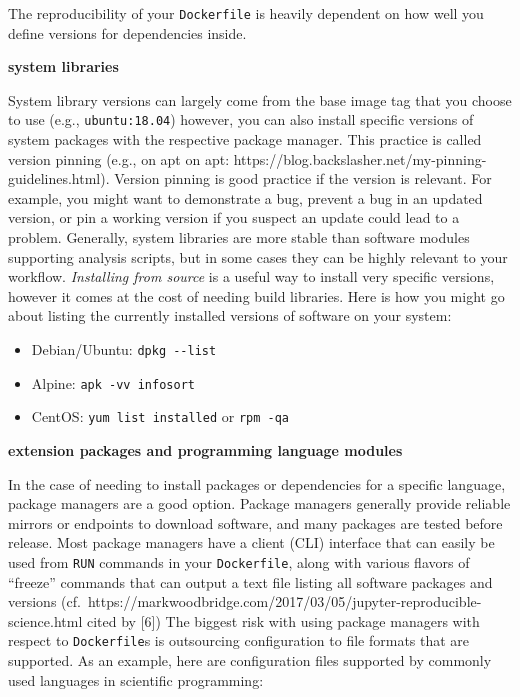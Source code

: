\documentclass[10pt,letterpaper]{article}
\providecommand{\tightlist}{%
  \setlength{\itemsep}{0pt}\setlength{\parskip}{0pt}}
\begin{document}
The reproducibility of your \texttt{Dockerfile} is heavily dependent on
how well you define versions for dependencies inside.

\textbf{system libraries}

System library versions can largely come from the base image tag that
you choose to use (e.g., \texttt{ubuntu:18.04}) however, you can also
install specific versions of system packages with the respective package
manager. This practice is called version pinning (e.g., on apt on apt:
https://blog.backslasher.net/my-pinning-guidelines.html). Version
pinning is good practice if the version is relevant. For example, you
might want to demonstrate a bug, prevent a bug in an updated version, or
pin a working version if you suspect an update could lead to a problem.
Generally, system libraries are more stable than software modules
supporting analysis scripts, but in some cases they can be highly
relevant to your workflow. \emph{Installing from source} is a useful way
to install very specific versions, however it comes at the cost of
needing build libraries. Here is how you might go about listing the
currently installed versions of software on your system:

\begin{itemize}
\tightlist
\item
  Debian/Ubuntu: \texttt{dpkg\ -\/-list}
\item
  Alpine: \texttt{apk\ -vv\ info\textbar{}sort}
\item
  CentOS: \texttt{yum\ list\ installed} or \texttt{rpm\ -qa}
\end{itemize}

\textbf{extension packages and programming language modules}

In the case of needing to install packages or dependencies for a
specific language, package managers are a good option. Package managers
generally provide reliable mirrors or endpoints to download software,
and many packages are tested before release. Most package managers have
a client (CLI) interface that can easily be used from \texttt{RUN}
commands in your \texttt{Dockerfile}, along with various flavors of
``freeze'' commands that can output a text file listing all software
packages and versions
(cf.~https://markwoodbridge.com/2017/03/05/jupyter-reproducible-science.html
cited by {[}6{]}) The biggest risk with using package managers with
respect to \texttt{Dockerfile}s is outsourcing configuration to file
formats that are supported. As an example, here are configuration files
supported by commonly used languages in scientific programming:
\end{document}

